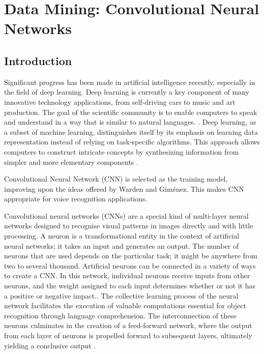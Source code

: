 %
%


\chapter{Data Mining: Convolutional Neural Networks}
\label{chapter 5}

\section{Introduction}

Significant progress has been made in artificial intelligence recently, especially in the field of deep learning. Deep learning is currently a key component of many innovative technology applications, from self-driving cars to music and art production. The goal of the scientific community is to enable computers to speak and understand in a way that is similar to natural languages. \cite{Li:2021}. Deep learning, as a subset of machine learning, distinguishes itself by its emphasis on learning data representation instead of relying on task-specific algorithms. This approach allows computers to construct intricate concepts by synthesizing information from simpler and more elementary components \cite{Sewak:2018}.

Convolutional Neural Network (CNN) is selected as the training model, improving upon the ideas offered by Warden \cite{War:2020} and Gim\'enez. This makes CNN appropriate for voice recognition applications. 

Convolutional neural networks (CNNs) are a special kind of multi-layer neural networks designed to recognise visual patterns in images directly and with little processing. A neuron is a transformational entity in the context of artificial neural networks; it takes an input and generates an output. The number of neurons that are used depends on the particular task; it might be anywhere from two to several thousand. Artificial neurons can be connected in a variety of ways to create a CNN. In this network, individual neurons receive inputs from other neurons, and the weight assigned to each input determines whether or not it has a positive or negative impact.. The collective learning process of the neural network facilitates the execution of valuable computations essential for object recognition through language comprehension. The interconnection of these neurons culminates in the creation of a feed-forward network, where the output from each layer of neurons is propelled forward to subsequent layers, ultimately yielding a conclusive output \cite{Gu:2018}.


